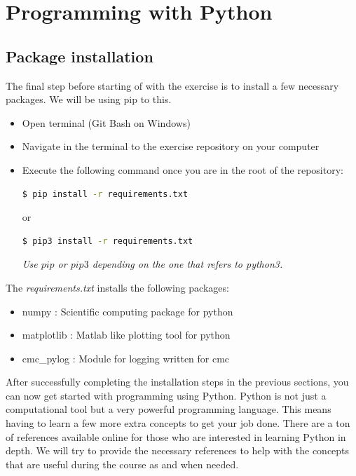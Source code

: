 \documentclass{cmc}
\begin{document}
\newpage
\section{Programming with Python}

\subsection{Package installation}
\label{sec:package-installation}

The final step before starting of with the exercise is to install a
few necessary packages. We will be using pip to this.

\begin{itemize}
\item Open terminal (Git Bash on Windows)
\item Navigate in the terminal to the exercise repository on your
  computer
\item Execute the following command once you are in the root of the
  repository:
\begin{lstlisting}[language=bash]
$ pip install -r requirements.txt
\end{lstlisting}
  or
\begin{lstlisting}[language=bash]
$ pip3 install -r requirements.txt
\end{lstlisting}
  \textit{Use $pip$ or $pip3$ depending on the one that refers to
    python3.}
\end{itemize}

The \textit{requirements.txt} installs the following packages:
\begin{itemize}
\item numpy : Scientific computing package for python
\item matplotlib : Matlab like plotting tool for python
\item cmc\_pylog : Module for logging written for cmc
\end{itemize}


After successfully completing the installation steps in the previous
sections, you can now get started with programming using Python.
Python is not just a computational tool but a very powerful
programming language. This means having to learn a few more extra
concepts to get your job done.  There are a ton of references
available online for those who are interested in learning Python in
depth. We will try to provide the necessary references to help with
the concepts that are useful during the course as and when needed.
\end{document}
